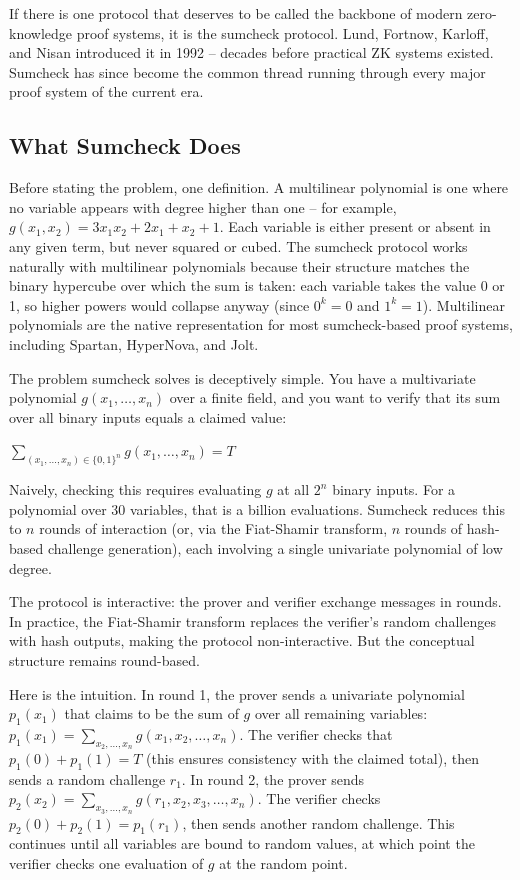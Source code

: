 \documentclass[
  11pt,
  openany]{report}
\begin{document}
If there is one protocol that deserves to be called the backbone of modern
zero-knowledge proof systems, it is the sumcheck protocol. Lund, Fortnow,
Karloff, and Nisan introduced it in 1992 -- decades before practical ZK systems
existed. Sumcheck has since become the common thread running through every major
proof system of the current era.

\subsection{What Sumcheck Does}\label{what-sumcheck-does}

Before stating the problem, one definition. A multilinear polynomial is one
where no variable appears with degree higher than one -- for example,
\(g(x_1, x_2) = 3x_1 x_2 + 2x_1 + x_2 + 1\). Each variable is either present or
absent in any given term, but never squared or cubed. The sumcheck protocol
works naturally with multilinear polynomials because their structure matches the
binary hypercube over which the sum is taken: each variable takes the value 0 or
1, so higher powers would collapse anyway (since \(0^k = 0\) and \(1^k = 1\)).
Multilinear polynomials are the native representation for most sumcheck-based
proof systems, including Spartan, HyperNova, and Jolt.

The problem sumcheck solves is deceptively simple. You have a multivariate
polynomial \(g(x_1, \ldots, x_n)\) over a finite field, and you want to verify
that its sum over all binary inputs equals a claimed value:

\(\sum_{(x_1, \ldots, x_n) \in \{0,1\}^n} g(x_1, \ldots, x_n) = T\)

Naively, checking this requires evaluating \(g\) at all \(2^n\) binary inputs.
For a polynomial over 30 variables, that is a billion evaluations. Sumcheck
reduces this to \(n\) rounds of interaction (or, via the Fiat-Shamir transform,
\(n\) rounds of hash-based challenge generation), each involving a single
univariate polynomial of low degree.

The protocol is interactive: the prover and verifier exchange messages in
rounds. In practice, the Fiat-Shamir transform replaces the verifier's random
challenges with hash outputs, making the protocol non-interactive. But the
conceptual structure remains round-based.

Here is the intuition. In round 1, the prover sends a univariate polynomial
\(p_1(x_1)\) that claims to be the sum of \(g\) over all remaining variables:
\(p_1(x_1) = \sum_{x_2,\ldots,x_n} g(x_1, x_2, \ldots, x_n)\). The verifier
checks that \(p_1(0) + p_1(1) = T\) (this ensures consistency with the claimed
total), then sends a random challenge \(r_1\). In round 2, the prover sends
\(p_2(x_2) = \sum_{x_3,\ldots,x_n} g(r_1, x_2, x_3, \ldots, x_n)\). The verifier
checks \(p_2(0) + p_2(1) = p_1(r_1)\), then sends another random challenge. This
continues until all variables are bound to random values, at which point the
verifier checks one evaluation of \(g\) at the random point.
\end{document}
